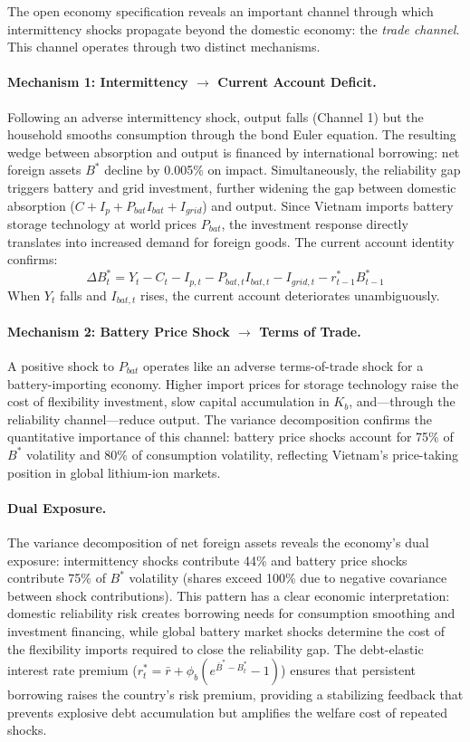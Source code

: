 \documentclass[12pt, a4paper]{article}
\begin{document}
The open economy specification reveals an important channel through which intermittency shocks propagate beyond the domestic economy: the \textit{trade channel}. This channel operates through two distinct mechanisms.

\paragraph{Mechanism 1: Intermittency $\to$ Current Account Deficit.} Following an adverse intermittency shock, output falls (Channel 1) but the household smooths consumption through the bond Euler equation. The resulting wedge between absorption and output is financed by international borrowing: net foreign assets $B^*$ decline by 0.005\% on impact. Simultaneously, the reliability gap triggers battery and grid investment, further widening the gap between domestic absorption ($C + I_p + P_{bat} I_{bat} + I_{grid}$) and output. Since Vietnam imports battery storage technology at world prices $P_{bat}$, the investment response directly translates into increased demand for foreign goods. The current account identity confirms:
\begin{equation*}
\Delta B^*_t = Y_t - C_t - I_{p,t} - P_{bat,t} I_{bat,t} - I_{grid,t} - r^*_{t-1} B^*_{t-1}
\end{equation*}
When $Y_t$ falls and $I_{bat,t}$ rises, the current account deteriorates unambiguously.

\paragraph{Mechanism 2: Battery Price Shock $\to$ Terms of Trade.} A positive shock to $P_{bat}$ operates like an adverse terms-of-trade shock for a battery-importing economy. Higher import prices for storage technology raise the cost of flexibility investment, slow capital accumulation in $K_b$, and---through the reliability channel---reduce output. The variance decomposition confirms the quantitative importance of this channel: battery price shocks account for 75\% of $B^*$ volatility and 80\% of consumption volatility, reflecting Vietnam's price-taking position in global lithium-ion markets.

\paragraph{Dual Exposure.} The variance decomposition of net foreign assets reveals the economy's dual exposure: intermittency shocks contribute 44\% and battery price shocks contribute 75\% of $B^*$ volatility (shares exceed 100\% due to negative covariance between shock contributions). This pattern has a clear economic interpretation: domestic reliability risk creates borrowing needs for consumption smoothing and investment financing, while global battery market shocks determine the cost of the flexibility imports required to close the reliability gap. The debt-elastic interest rate premium ($r^*_t = \bar{r} + \phi_b(e^{\bar{B}^* - B^*_t} - 1)$) ensures that persistent borrowing raises the country's risk premium, providing a stabilizing feedback that prevents explosive debt accumulation but amplifies the welfare cost of repeated shocks.
\end{document}

